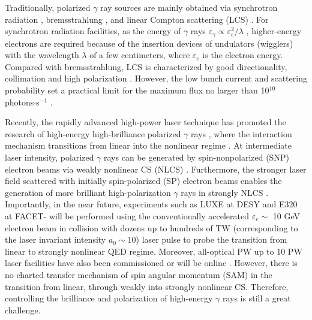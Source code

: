 \documentclass[10pt,twocolumn,showpacs,amsmath,amssymb,floatfix,superscriptaddress]{revtex4-2}
\begin{document}
Traditionally, polarized $\gamma$ ray sources are mainly obtained via synchrotron radiation \cite{Rousse2001,Bilderback2005}, bremsstrahlung \cite{Schwengner2005, Sonnabend2011}, and linear Compton scattering (LCS) \cite{Kawase2008,Amano2009,Ur2015}. For synchrotron radiation facilities, as the energy of $\gamma$ rays $\varepsilon_\gamma \propto \varepsilon_e^2/\lambda$ \cite{Bech2009,Als2011}, higher-energy electrons are required because of the insertion devices of undulators (wigglers) with the wavelength $\lambda$ of a few centimeters, where $\varepsilon_e$ is the electron energy. Compared with bremsstrahlung, LCS is characterized by good directionality, collimation and high polarization \cite{Albert2010,Sarri2014}. However, the low bunch current and scattering probability set a practical limit for the maximum flux no larger than 10$^{10}$ photons$\cdot$s$^{-1}$ \cite{Budker2022}.

Recently, the rapidly advanced high-power laser technique \cite{Gales2018,Danson2019,Yoon2019,Yoon2021} has promoted the research of high-energy high-brilliance polarized $\gamma$ rays \cite{Sarri2014,Khrennikov2015,Yan2017}, where the interaction mechanism transitions from linear into the nonlinear regime \cite{Bula1996,Ivanov2004,Yousef2006,Xiao2023}. At intermediate laser intensity, polarized $\gamma$ rays can be generated by spin-nonpolarized (SNP) electron beams via weakly nonlinear CS (NLCS) \cite{Wistisen2019,King2020,Tang2020,Wang2022}. Furthermore, the stronger laser field scattered with initially spin-polarized (SP) electron beams enables the generation of more brilliant high-polarization $\gamma$ rays in strongly NLCS \cite{Li2020}. Importantly, in the near future, experiments such as LUXE at DESY \cite{Abramowicz2021} and E320 at FACET-\uppercase\expandafter{} \cite{Meuren2019} will be performed using the conventionally accelerated $\varepsilon_{e} \sim$ 10 GeV electron beam in collision with dozens up to hundreds of TW (corresponding to the laser invariant intensity $a_0 \sim 10$) laser pulse to probe the transition from linear to strongly nonlinear QED regime. Moreover, all-optical PW up to 10 PW laser facilities have also been commissioned or will be online \cite{Bruno2014,Zou2014,Gan2021,Gonoskov2022,Fedotov2023}. However, there is no charted transfer mechanism of spin angular momentum (SAM) in the transition from linear, through weakly into strongly nonlinear CS. Therefore, controlling the brilliance and polarization of high-energy $\gamma$ rays is still a great challenge. 
\end{document}
